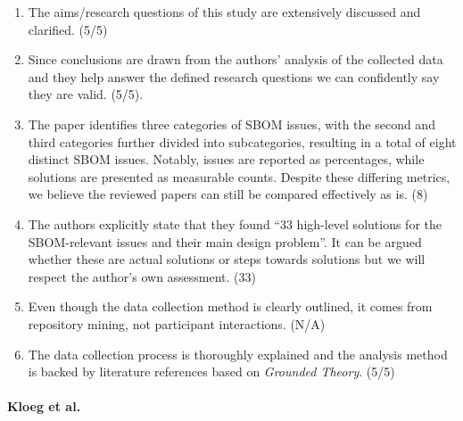 \begin{enumerate}
    \item The aims/research questions of this study are extensively discussed and clarified. (5/5)
    \item Since conclusions are drawn from the authors' analysis of the collected data and they help answer the defined research questions we can confidently say they are valid. (5/5).
    \item The paper identifies three categories of SBOM issues, with the second and third categories further divided into subcategories, resulting in a total of eight distinct SBOM issues. Notably, issues are reported as percentages, while solutions are presented as measurable counts. Despite these differing metrics, we believe the reviewed papers can still be compared effectively as is. (8)
    \item The authors explicitly state that they found \enquote{33 high-level solutions for the SBOM-relevant issues and their main design problem}. It can be argued whether these are actual solutions or steps towards solutions but we will respect the author's own assessment. (33)
    \item Even though the data collection method is clearly outlined, it comes from repository mining, not participant interactions. (N/A)
    \item The data collection process is thoroughly explained and the analysis method is backed by literature references based on \emph{Grounded Theory}. (5/5)
\end{enumerate}

\paragraph{Kloeg et al. \cite{article:business-sbom}}

